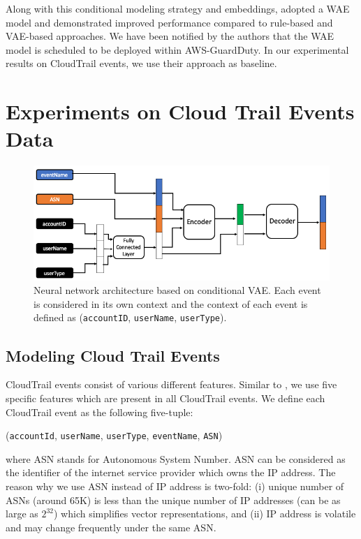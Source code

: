 \documentclass{article}
\theoremstyle{plain}
\theoremstyle{definition}
\begin{document}
Along with this conditional modeling strategy and embeddings, \citet{coskun2019detecting}  adopted a WAE model and demonstrated improved performance compared to rule-based and VAE-based approaches. We have been notified by the authors that the WAE model is scheduled to be deployed within AWS-GuardDuty.  In our experimental results on CloudTrail events, we use their approach as baseline.

\section{Experiments on Cloud Trail Events Data}
 \begin{figure}[h!]
	\centering
	\includegraphics[scale=.5]{./figures/architecture.png}
	\caption{Neural network architecture based on conditional VAE. Each event is considered in its own context and the context of each event is defined as (\texttt{accountID}, \texttt{userName}, \texttt{userType}).}
	\label{fig:architecture}
\end{figure}
\subsection{Modeling Cloud Trail Events}
CloudTrail events consist of various different features.  Similar to \cite{coskun2019detecting}, we use five specific features which are present in all CloudTrail events. 
We define each CloudTrail event as the following five-tuple: 
\begin{center}
\small
(\texttt{accountId}, \texttt{userName}, \texttt{userType}, \texttt{eventName}, \texttt{ASN})
\end{center}
where ASN stands for Autonomous System Number.  ASN can be considered as the identifier of the internet service provider which owns the IP address. The reason why we use ASN instead of IP address is two-fold: (i) unique number of ASNs (around 65K) is less than the unique number of IP addresses (can be as large as $2^{32}$) which simplifies vector representations, and (ii) IP address is volatile and may change frequently under the same ASN.
\end{document}
